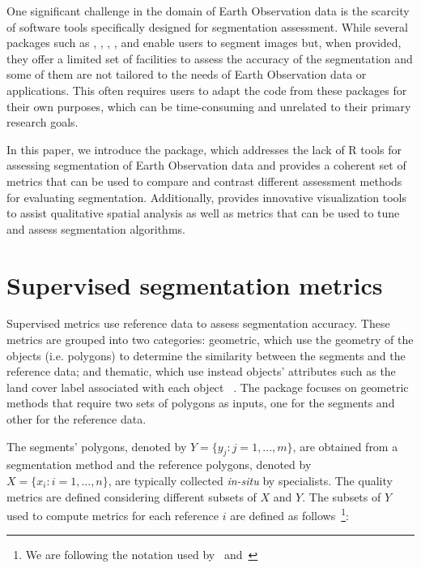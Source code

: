 One significant challenge in the domain of Earth Observation data is the scarcity of software tools specifically designed for segmentation assessment. 
While several packages such as  \citep{Niedballa2022},  \citep{Azevedo2022},  \citep{Mouselimis2022},  \citep{Mouselimis2022b}, and  \citep{Wijffels2020} enable users to segment images but, when provided, they offer a limited set of facilities to assess the accuracy of the segmentation and some of them are not tailored to the needs of Earth Observation data or applications. 
This often requires users to adapt the code from these packages for their own purposes,
which can be time-consuming and unrelated to their primary research goals.

In this paper, we introduce the  package, which addresses the lack of R tools for assessing segmentation of Earth Observation data and provides a coherent set of metrics that can be used to compare and contrast different assessment methods for evaluating segmentation. Additionally,  provides innovative visualization tools to assist qualitative spatial analysis as well as metrics that can be used to tune and assess segmentation algorithms.

\section{Supervised segmentation metrics}

Supervised metrics use reference data to assess segmentation accuracy. 
These metrics are grouped into two categories: geometric, which use the geometry of the objects (i.e. polygons) to determine the similarity between the segments and the reference data; and thematic, which use instead objects' attributes such as the land cover label associated with each object
~\citep{Costa2018}. The  package focuses on geometric methods that require two sets of polygons as inputs, one for the segments and other for the reference data.

The segments' polygons, denoted by $Y = \{y_j: j = 1, ..., m\}$, are obtained from a segmentation method and the reference polygons, denoted by $X = \{x_i: i = 1, ..., n\}$, are typically collected \textit{in-situ} by specialists. The quality metrics are defined considering different subsets of $X$ and $Y$. The subsets of $Y$ used to compute metrics for each reference $i$ are defined as follows~\footnote{We are following the notation used by~\citet{Clinton2010} and~\citet{Costa2018}}:

